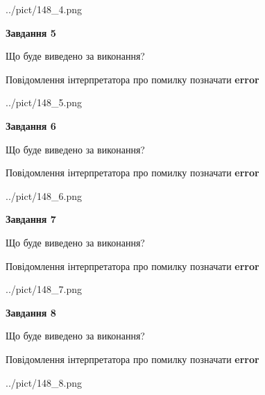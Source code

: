 \documentclass[12pt, ukrainian]{article}
\begin{document}
{\begin{center}
	{../pict/148_4.png}
\end{center}
\newpage

{\begin {center}\textbf{Завдання 5}\end {center}}\par
Що буде виведено за виконання? \par
Повідомлення інтерпретатора про помилку позначати \textbf{error}

\begin{center}
	{../pict/148_5.png}
\end{center}
\newpage

{\begin {center}\textbf{Завдання 6}\end {center}}\par
Що буде виведено за виконання? \par
Повідомлення інтерпретатора про помилку позначати \textbf{error}

\begin{center}
	{../pict/148_6.png}
\end{center}
\newpage

{\begin {center}\textbf{Завдання 7}\end {center}}\par
Що буде виведено за виконання? \par
Повідомлення інтерпретатора про помилку позначати \textbf{error}

\begin{center}
	{../pict/148_7.png}
\end{center}
\newpage

{\begin {center}\textbf{Завдання 8}\end {center}}\par
Що буде виведено за виконання? \par
Повідомлення інтерпретатора про помилку позначати \textbf{error}

\begin{center}
	{../pict/148_8.png}
\end{center}
\newpage

}
\end{document}
